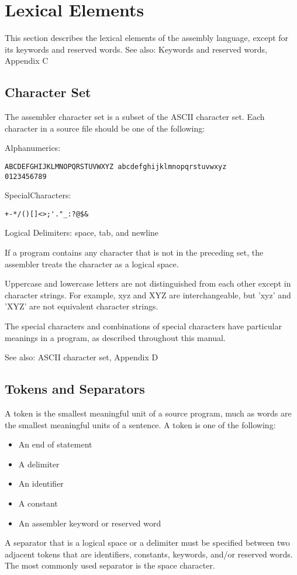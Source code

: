 \section*{Lexical Elements}


This section describes the lexical elements of the assembly language, except for its keywords and reserved words.
See also: Keywords and reserved words, Appendix C

\subsection*{Character Set}


The assembler character set is a subset of the ASCII character set. Each character in a source file should be one of the following:

Alphanumerics: \begin{verbatim}ABCDEFGHIJKLMNOPQRSTUVWXYZ abcdefghijklmnopqrstuvwxyz
0123456789\end{verbatim}

SpecialCharacters: \begin{verbatim}+-*/()[]<>;'."_:?@$&\end{verbatim}

Logical Delimiters: space, tab, and newline

If a program contains any character that is not in the preceding set, the assembler treats the character as a logical space.

Uppercase and lowercase letters are not distinguished from each other except in character strings. For example, xyz and XYZ are interchangeable, but 'xyz' and 'XYZ' are not equivalent character strings.

The special characters and combinations of special characters have particular meanings in a program, as described throughout this manual.

See also: ASCII character set, Appendix D

\subsection*{Tokens and Separators}
A token is the smallest meaningful unit of a source program, much as words are the smallest meaningful units of a sentence. A token is one of the following:
\begin{itemize}
\item An end of statement
\item A delimiter
\item An identifier
\item A constant
\item An assembler keyword or reserved word
\end{itemize}
A separator that is a logical space or a delimiter must be specified between two adjacent tokens that are identifiers, constants, keywords, and/or reserved words. The most commonly used separator is the space character.

